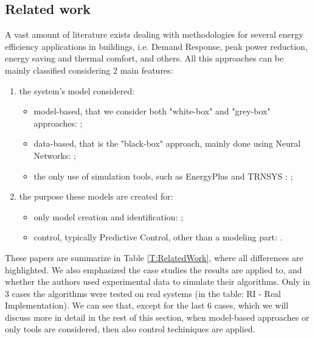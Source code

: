 \textcolor[rgb]{0,0,1}{
\subsection{Related work}
A vast amount of literature exists dealing with methodologies for several energy efficiency applications in buildings, i.e. Demand Response, peak power reduction, energy saving and thermal comfort, and others.
All this approaches can be mainly classified considering 2 main features:
\begin{enumerate}
	\item the system's model considered:
		\begin{itemize}
			\item model-based, that we consider both "white-box" and "grey-box" approaches: \cite{Shakouri2017SCS,Li2014EB,Yoon2014EB,Li2016AE,Harb2016EB,Salakij2016EB,Li2016E,Li2016EB,Hou2013,Cecconi2017EB};
			\item data-based, that is the "black-box" approach, mainly done using Neural Networks: \cite{Safa2017SCS,Neto2008EB,Magnier2010BE,Candanedo2017EB,Ascione2017E,Cecconi2017EB,Li2016AE};
			\item the only use of simulation tools, such as EnergyPlus \cite{energyPlus} and TRNSYS \cite{trnsys2000}: \cite{Yin2016EB,Christantoni2016EB};
		\end{itemize}
	\item the purpose these models are created for:
		\begin{itemize}
			\item only model creation and identification: \cite{Safa2017SCS,Neto2008EB,Magnier2010BE,Li2014EB,Li2016AE,Harb2016EB,Li2016EB,Candanedo2017EB,Cecconi2017EB,Ascione2017E};
			\item control, typically Predictive Control, other than a modeling part: \cite{Shakouri2017SCS,Yoon2014EB,Yin2016EB,Salakij2016EB,Li2016E,Hu2017AE}.
		\end{itemize}
\end{enumerate}
These papers are summarize in Table \ref{T:RelatedWork}, where all differences are highlighted.
We also emphasized the case studies the results are applied to, and whether the authors used experimental data to simulate their algorithms.
Only in 3 cases the algorithms were tested on real systems (in the table: RI - Real Implementation).
We can see that, except for the last 6 cases, which we will discuss more in detail in the rest of this section, when model-based approaches or only tools are considered, then also control techiniques are applied.
}
